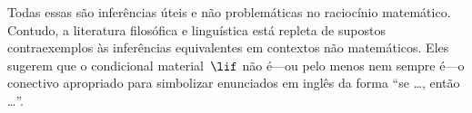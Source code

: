 \documentclass[../../../include/open-logic-section]{subfiles}
\begin{document}
Todas essas são inferências úteis e não problemáticas no raciocínio
matemático. Contudo, a literatura filosófica e linguística está
repleta de supostos contraexemplos às inferências equivalentes em
contextos não matemáticos. Eles sugerem que o condicional
material~$\lif$ não é---ou pelo menos nem sempre é---o conectivo
apropriado para simbolizar enunciados em inglês da forma ``se \dots,
então \dots''.
\end{document}

